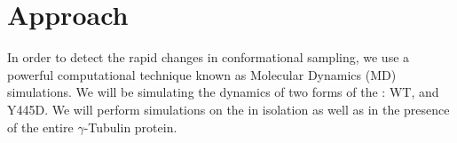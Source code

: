  \section{Approach}
 
In order to detect the rapid changes in conformational sampling, we use a powerful computational technique known as Molecular Dynamics (MD) simulations. We will be simulating the dynamics of two forms of the \gct{}: WT, and Y445D. We will perform simulations on the \gct{} in isolation as well as in the presence of the entire $\gamma$-Tubulin protein. 

 
 
 
 
 